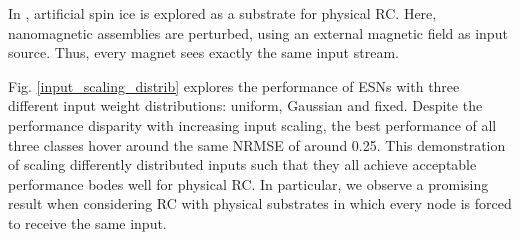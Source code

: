 In \cite{jensen_computation_2018}, artificial spin ice is explored as a
substrate for physical RC. Here, nanomagnetic assemblies are perturbed, using an
external magnetic field as input source. Thus, every magnet sees exactly the
same input stream.

Fig. \ref{input_scaling_distrib} explores the performance of ESNs with three
different input weight distributions: uniform, Gaussian and fixed. Despite the
performance disparity with increasing input scaling, the best performance of all
three classes hover around the same NRMSE of around 0.25. This demonstration of
scaling differently distributed inputs such that they all achieve acceptable
performance bodes well for physical RC. In particular, we observe a promising
result when considering RC with physical substrates in which every node is
forced to receive the same input.

